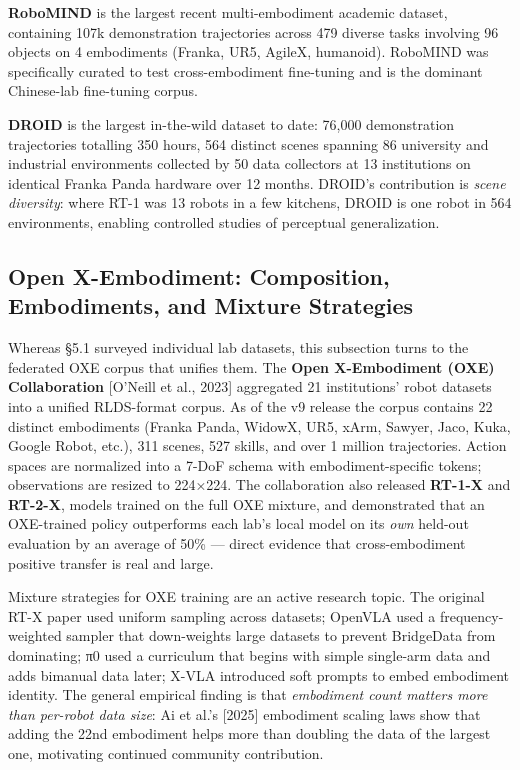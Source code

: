 \documentclass{article}
\begin{document}
\textbf{RoboMIND} \cite{wu2024robomindbenchmarko} is the largest recent multi-embodiment academic dataset, containing 107k demonstration trajectories across 479 diverse tasks involving 96 objects on 4 embodiments (Franka, UR5, AgileX, humanoid). RoboMIND was specifically curated to test cross-embodiment fine-tuning and is the dominant Chinese-lab fine-tuning corpus.

\textbf{DROID} \cite{khazatsky2024droidalargescalein} is the largest in-the-wild dataset to date: 76,000 demonstration trajectories totalling 350 hours, 564 distinct scenes spanning 86 university and industrial environments collected by 50 data collectors at 13 institutions on identical Franka Panda hardware over 12 months. DROID's contribution is \emph{scene diversity}: where RT-1 was 13 robots in a few kitchens, DROID is one robot in 564 environments, enabling controlled studies of perceptual generalization.

\subsection{Open X-Embodiment: Composition, Embodiments, and Mixture Strategies}\label{open-x-embodiment-composition-embodiments-and-mixture-strategies}

Whereas §5.1 surveyed individual lab datasets, this subsection turns to the federated OXE corpus that unifies them. The \textbf{Open X-Embodiment (OXE) Collaboration} {[}O'Neill et al., 2023{]} aggregated 21 institutions' robot datasets into a unified RLDS-format corpus. As of the v9 release the corpus contains 22 distinct embodiments (Franka Panda, WidowX, UR5, xArm, Sawyer, Jaco, Kuka, Google Robot, etc.), 311 scenes, 527 skills, and over 1 million trajectories. Action spaces are normalized into a 7-DoF schema with embodiment-specific tokens; observations are resized to 224×224. The collaboration also released \textbf{RT-1-X} and \textbf{RT-2-X}, models trained on the full OXE mixture, and demonstrated that an OXE-trained policy outperforms each lab's local model on its \emph{own} held-out evaluation by an average of 50\% --- direct evidence that cross-embodiment positive transfer is real and large.

Mixture strategies for OXE training are an active research topic. The original RT-X paper used uniform sampling across datasets; OpenVLA used a frequency-weighted sampler that down-weights large datasets to prevent BridgeData from dominating; π0 used a curriculum that begins with simple single-arm data and adds bimanual data later; X-VLA introduced soft prompts to embed embodiment identity. The general empirical finding is that \emph{embodiment count matters more than per-robot data size}: Ai et al.'s {[}2025{]} embodiment scaling laws show that adding the 22nd embodiment helps more than doubling the data of the largest one, motivating continued community contribution.
\end{document}
